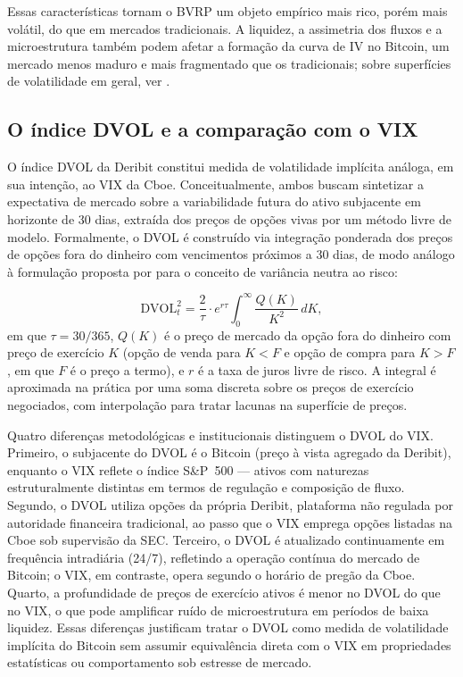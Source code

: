 Essas características tornam o BVRP um objeto empírico mais rico, porém mais
volátil, do que em mercados tradicionais. A
liquidez, a assimetria dos fluxos e a microestrutura também podem afetar a
formação da curva de IV no Bitcoin, um mercado menos maduro e mais fragmentado que os
tradicionais; sobre superfícies de volatilidade em geral, ver
\citet{gatheral2011volsurface}.

\subsection{O índice DVOL e a comparação com o VIX}
\label{sec:refer-dvol}

O índice DVOL da Deribit constitui medida de volatilidade implícita análoga, em sua intenção, ao VIX da Cboe. Conceitualmente, ambos buscam sintetizar a expectativa de mercado sobre a variabilidade futura do ativo subjacente em horizonte de 30 dias, extraída dos preços de opções vivas por um método livre de modelo. Formalmente, o DVOL é construído via integração ponderada dos preços de opções fora do dinheiro com vencimentos próximos a 30 dias, de modo análogo à formulação proposta por \citet{carr2009variance} para o conceito de variância neutra ao risco:

\begin{equation}
\text{DVOL}_t^2 = \frac{2}{\tau} \cdot e^{r\tau} \int_0^{\infty} \frac{Q(K)}{K^2} \, dK,
\label{eq:refer-dvol}
\end{equation}
em que $\tau = 30/365$, $Q(K)$ é o preço de mercado da opção fora do dinheiro com preço de exercício $K$ (opção de venda para $K < F$ e opção de compra para $K > F$, em que $F$ é o preço a termo), e $r$ é a taxa de juros livre de risco. A integral é aproximada na prática por uma soma discreta sobre os preços de exercício negociados, com interpolação para tratar lacunas na superfície de preços.

Quatro diferenças metodológicas e institucionais distinguem o DVOL do VIX. Primeiro, o subjacente do DVOL é o Bitcoin (preço à vista agregado da Deribit), enquanto o VIX reflete o índice S\&P~500 --- ativos com naturezas estruturalmente distintas em termos de regulação e composição de fluxo. Segundo, o DVOL utiliza opções da própria Deribit, plataforma não regulada por autoridade financeira tradicional, ao passo que o VIX emprega opções listadas na Cboe sob supervisão da SEC. Terceiro, o DVOL é atualizado continuamente em frequência intradiária (24/7), refletindo a operação contínua do mercado de Bitcoin; o VIX, em contraste, opera segundo o horário de pregão da Cboe. Quarto, a profundidade de preços de exercício ativos é menor no DVOL do que no VIX, o que pode amplificar ruído de microestrutura em períodos de baixa liquidez. Essas diferenças justificam tratar o DVOL como medida de volatilidade implícita do Bitcoin sem assumir equivalência direta com o VIX em propriedades estatísticas ou comportamento sob estresse de mercado.

